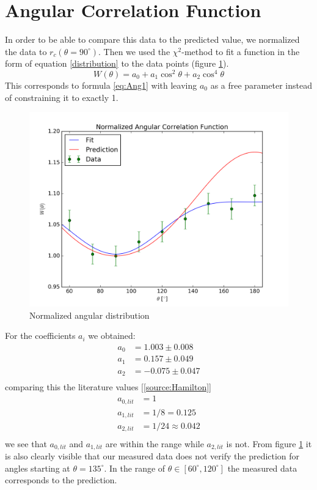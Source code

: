 \documentclass[a4paper,parskip,11pt, DIV12]{scrreprt}
\begin{document}
\section{Angular Correlation Function}

In order to be able to compare this data to the predicted value, we normalized the data to $r_{c}(\theta=90^{\circ})$. Then we used the $\chi^2$-method to fit a function in the form of equation \ref{distribution} to the data points (figure \ref{fig:distribution}).
\begin{equation}
W(\theta) = a_0 + a_1 \cos^2 \theta + a_2 \cos^4 \theta
\end{equation}
This corresponds to formula \ref{eq:Ang1} with leaving $a_0$ as a free parameter instead of constraining it to exactly 1.
%
\begin{figure}[H]
\centering
\includegraphics[scale=0.65]{dist.png}
\caption[Distribution]{Normalized angular distribution}
\label{fig:distribution}
\end{figure}
%
For the coefficients $a_i$ we obtained:
%
\begin{align*}
a_0 &= 1.003 \pm 0.008\\
a_1 &= 0.157 \pm 0.049\\
a_2 &= -0.075 \pm 0.047\\
\end{align*}
%
comparing this the literature values [\ref{source:Hamilton}]
%
\begin{align*}
a_{0,lit} &= 1\\
a_{1,lit} &= 1/8 = 0.125\\
a_{2,lit} &= 1/24 \approx 0.042\\
\end{align*}
%
we see that $a_{0,lit}$ and $a_{1,lit}$ are within the range while $a_{2,lit}$ is not. From figure \ref{fig:distribution} it is also clearly visible that our measured data does not verify the prediction for angles starting at $\theta=135^{\circ}$. In the range of $\theta \in \left[60^{\circ},120^{\circ}\right]$ the measured data corresponds to the prediction.
\end{document}
